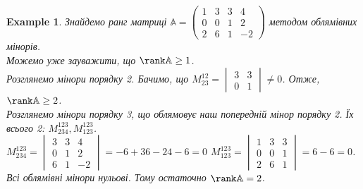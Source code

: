 \documentclass[a4paper, 10pt]{article}
\theoremstyle{theoremdd}
\newtheorem{example}[theorem]{Example}
\begin{document}
\begin{example}
Знайдемо ранг матриці $\mathbb{A} = \begin{pmatrix}
1 & 3 & 3 & 4 \\
0 & 0 & 1 & 2 \\
2 & 6 & 1 & -2
\end{pmatrix}$ методом облямівних мінорів.\\
Можемо уже зауважити, що $\rank \mathbb{A} \geq 1$. \\ Розглянемо мінори порядку 2. Бачимо, що $M^{12}_{23} = \begin{vmatrix}
3 & 3 \\
0 & 1
\end{vmatrix} \neq 0$. Отже, $\rank \mathbb{A} \geq 2$. \\
Розглянемо мінори порядку 3, що облямовує наш попередній мінор порядку 2. Їх всього 2: $M^{123}_{234},M^{123}_{123}$.\\
$M^{123}_{234} = \begin{vmatrix}
3 & 3 & 4 \\
0 & 1 & 2 \\
6 & 1 & -2
\end{vmatrix} = -6+36-24-6 = 0$ \hspace{1cm} $M^{123}_{123} = \begin{vmatrix}
1 & 3 & 3 \\
0 & 0 & 1 \\
2 & 6 & 1
\end{vmatrix} = 6 - 6 = 0$.\\
Всі облямівні мінори нульові. Тому остаточно $\rank \mathbb{A} = 2$.
\end{example}
\end{document}
